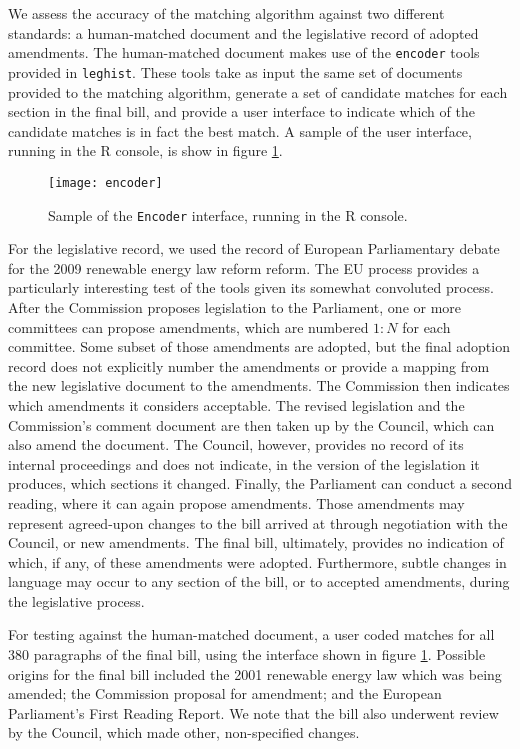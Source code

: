 \documentclass[11pt]{article}
\begin{document}
We assess the accuracy of the matching algorithm against two different
standards: a human-matched document and the legislative record of
adopted amendments. The human-matched document makes use of the
\texttt{encoder} tools provided in \texttt{leghist}. These tools take
as input the same set of documents provided to the matching algorithm,
generate a set of candidate matches for each section in the final
bill, and provide a user interface to indicate which of the candidate
matches is in fact the best match. A sample of the user interface,
running in the R console, is show in figure \ref{fig:encoder-interface}.

\begin{figure}[ht]
  \centering
  \texttt{[image: encoder]}
  \caption{Sample of the \texttt{Encoder} interface, running in the R console. }
  \label{fig:encoder-interface}
\end{figure}

For the legislative record, we used the record of European
Parliamentary debate for the 2009 renewable energy law reform reform. The EU process
provides a particularly interesting test of the tools given its
somewhat convoluted process. After the Commission proposes legislation
to the Parliament, one or more committees can propose amendments,
which are numbered $1:N$ for each committee. Some subset of those
amendments are adopted, but the final adoption record does not
explicitly number the amendments or provide a mapping from the new
legislative document to the amendments. The Commission then indicates
which amendments it considers acceptable. The revised legislation and
the Commission's comment document are then taken up by the Council,
which can also amend the document. The Council, however, provides no
record of its internal proceedings and does not indicate, in the
version of the legislation it produces, which sections it
changed. Finally, the Parliament can conduct a second reading, where
it can again propose amendments. Those amendments may represent
agreed-upon changes to the bill arrived at through negotiation with
the Council, or new amendments. The final bill, ultimately, provides
no indication of which, if any, of these amendments were
adopted. Furthermore, subtle changes in language may occur to any
section of the bill, or to accepted amendments, during the legislative
process. 

For testing against the human-matched document, a user coded matches
for all 380 paragraphs of the final bill, using the interface shown in
figure \ref{fig:encoder-interface}. Possible origins for the final
bill included the 2001 renewable energy law which was being amended;
the Commission proposal for amendment; and the European Parliament's
First Reading Report. We note that the bill also underwent review by
the Council, which made other, non-specified changes. 
\end{document}
